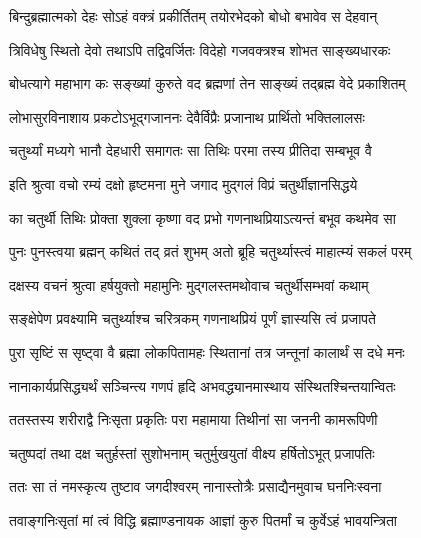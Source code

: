 \twolineshloka
{बिन्दुब्रह्मात्मको देहः सोऽहं वक्त्रं प्रकीर्तितम्}
{तयोरभेदको बोधो बभावेव स देहवान्} %

\twolineshloka
{त्रिविधेषु स्थितो देवो तथाऽपि तद्विवर्जितः}
{विदेहो गजवक्त्रश्च शोभत साङ्ख्यधारकः} %

\twolineshloka
{बोधत्यागे महाभाग कः सङ्ख्यां कुरुते वद}
{ब्रह्मणां तेन साङ्ख्यं तद्ब्रह्म वेदे प्रकाशितम्} %

\twolineshloka
{लोभासुरविनाशाय प्रकटोऽभूद्गजाननः}
{देवैर्विप्रैः प्रजानाथ प्रार्थितो भक्तिलालसः} %

\twolineshloka
{चतुर्थ्यां मध्यगे भानौ देहधारी समागतः}
{सा तिथिः परमा तस्य प्रीतिदा सम्बभूव वै} %


\twolineshloka
{इति श्रुत्वा वचो रम्यं दक्षो हृष्टमना मुने}
{जगाद मुद्गलं विप्रं चतुर्थीज्ञानसिद्धये} %


\twolineshloka
{का चतुर्थी तिथिः प्रोक्ता शुक्ला कृष्णा वद प्रभो}
{गणनाथप्रियाऽत्यन्तं बभूव कथमेव सा} %

\twolineshloka
{पुनः पुनस्त्वया ब्रह्मन् कथितं तद् व्रतं शुभम्}
{अतो ब्रूहि चतुर्थ्यास्त्वं माहात्म्यं सकलं परम्} %

\twolineshloka
{दक्षस्य वचनं श्रुत्वा हर्षयुक्तो महामुनिः}
{मुद्गलस्तमथोवाच चतुर्थीसम्भवां कथाम्} %


\twolineshloka
{सङ्क्षेपेण प्रवक्ष्यामि चतुर्थ्याश्च चरित्रकम्}
{गणनाथप्रियं पूर्णं ज्ञास्यसि त्वं प्रजापते} %

\twolineshloka
{पुरा सृष्टिं स सृष्ट्वा वै ब्रह्मा लोकपितामहः}
{स्थितानां तत्र जन्तूनां कालार्थं स दधे मनः} %

\twolineshloka
{नानाकार्यप्रसिद्ध्यर्थं सञ्चिन्त्य गणपं हृदि}
{अभवद्ध्यानमास्थाय संस्थितश्चिन्तयान्वितः} %

\twolineshloka
{ततस्तस्य शरीराद्वै निःसृता प्रकृतिः परा}
{महामाया तिथीनां सा जननी कामरूपिणी} %

\twolineshloka
{चतुष्पदां तथा दक्ष चतुर्हस्तां सुशोभनाम्}
{चतुर्मुखयुतां वीक्ष्य हर्षितोऽभूत् प्रजापतिः} %

\twolineshloka
{ततः सा तं नमस्कृत्य तुष्टाव जगदीश्वरम्}
{नानास्तोत्रैः प्रसाद्यैनमुवाच घननिःस्वना} %


\twolineshloka
{तवाङ्गनिःसृतां मां त्वं विद्धि ब्रह्माण्डनायक}
{आज्ञां कुरु पितर्मां च कुर्वेऽहं भावयन्त्रिता} %

